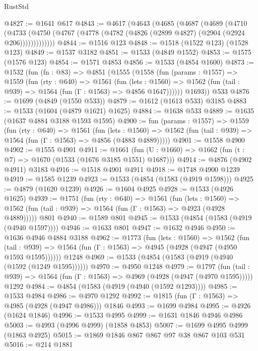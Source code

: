 \begin{lexlean}{RustStd}
\begin{coremodule}
@4827 := @1641 @617
@4843 := @4617
    (@4643
      (@4685
        (@4687
          (@4689
            (@4710
              (@4733
                (@4750 (@4767 (@4778 (@4782 (@4826 (@2899 @4827) (@2904 (@2924 @206)))))))))))))
@4844 := @1516 @123
@4848 := @1518 (@1522 @123) (@1528 @123)
@4849 := @1537 @3182
@4851 := @1533 (@4849 @1552)
@4853 := @1575 (@1576 @123)
@4854 := @1571 @4853
@4856 := @1533 (@4854 @1600)
@4873 := @1532
    (fun (fn : @83) =>
    @4851
      (@1555
        (@1558
          (fun (params : @1557) =>
          @1559
            (fun (rty : @640) =>
            @1561
              (fun (lets : @1560) =>
              @1562 (fun (tail : @939) => @1564 (fun (Γ : @1563) => @4856 @1647))))))
        @1693))
    @533
@4876 := @1699 (@4849 (@1550 @533))
@4879 := @1612 (@1613 @533) @3185
@4883 := @1533 (@1604 (@4879 @1621) @1625)
@4884 := @1638 @533
@4889 := @1635 (@1637 @4884 @3188 @1593 @1595)
@4900 := fun (params : @1557) =>
  @1559
    (fun (rty : @640) =>
    @1561
      (fun (lets : @1560) =>
      @1562 (fun (tail : @939) => @1564 (fun (Γ : @1563) => @4856 (@4883 @4889)))))
@4901 := @1558 @4900
@4902 := @1555 @4901
@4911 := @1661 (fun (U : @1660) => @1662 (fun (t : @7) => @1670 (@1533 (@1676 @3185 @1551) @1687)))
@4914 := @4876 (@4902 @4911) @3183
@4916 := @1518 @4901 @4911
@4918 := @1748 @4900 @1239
@4919 := @1585 @1239
@4923 := @1533 (@4854 (@1583 (@4919 @1598)))
@4925 := @4879 (@1620 @1239)
@4926 := @1604 @4925
@4928 := @1533 (@4926 @1625)
@4939 := @1751
    (fun (rty : @640) =>
    @1561
      (fun (lets : @1560) =>
      @1562 (fun (tail : @939) => @1564 (fun (Γ : @1563) => @4923 (@4928 @4889)))))
    @801
@4940 := @1589 @801
@4945 := @1533 (@4854 (@1583 (@4919 (@4940 @1597))))
@4946 := @1633 @801
@4947 := @1632 @4946
@4950 := @1636 @4946 @4884 @3188
@4962 := @1773
    (fun (lets : @1560) =>
    @1562
      (fun (tail : @939) => @1564 (fun (Γ : @1563) => @4945 (@4928 (@4947 (@4950 @1593 @1595))))))
    @1248
@4969 := @1533 (@4854 (@1583 (@4919 (@4940 (@1592 (@1249 @1595))))))
@4970 := @4950 @1248
@4979 := @1797
    (fun (tail : @939) => @1564 (fun (Γ : @1563) => @4969 (@4928 (@4947 (@4970 @1595)))))
    @1292
@4984 := @4854 (@1583 (@4919 (@4940 (@1592 @1293))))
@4985 := @1533 @4984
@4986 := @4970 @1292
@4992 := @1815 (fun (Γ : @1563) => @4985 (@4928 (@4947 @4986))) @1846
@4993 := @1699 @4984
@4995 := @4926 (@1624 @1846)
@4996 := @1533 @4995
@4999 := @1631 @1846 @4946 @4986
@5003 := @4993 (@4996 @4999) (@1858 @4853)
@5007 := @1699 @4995 @4999 (@1863 @4925)
@5015 := @1869 @1846 @867 @867 @97 @38 @867 @103 @531
@5016 := @214 @1881

\end{coremodule}
\end{lexlean}
